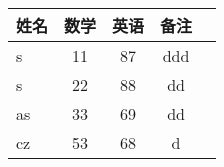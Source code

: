 \documentclass{ctexart}
\begin{document}
	\begin{tabular}{|l||c|c|c|p{1.5cm}|}
		\hline
		姓名 & 数学 & 英语 & 备注 \\
		\hline \hline
		s & 11 & 87 & ddd \\
		\hline
		s & 22 & 88 & dd \\
		\hline
		as & 33 & 69 & dd \\
		\hline
		cz & 53 & 68 & d \\
	\end{tabular}
\end{document}
